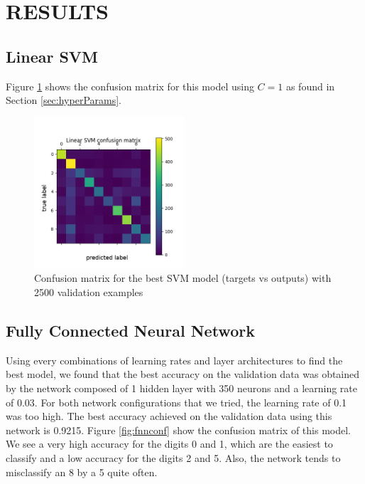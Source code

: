 \documentclass[letterpaper, 10 pt, conference]{ieeeconf}  %
\begin{document}
\section{RESULTS}

\subsection{Linear SVM}
Figure \ref{fig:svmconf} shows the confusion matrix for this model using $C=1$ as found in Section \ref{sec:hyperParams}.


\begin{figure}[h]
	\begin{center}
			\includegraphics[width=0.5\textwidth]{figures/svm_conf.png}  %
		\caption{Confusion matrix for the best SVM model (targets vs outputs) with 2500 validation examples}
		\label{fig:svmconf}
	\end{center}
\end{figure}


\subsection{Fully Connected Neural Network}
Using every combinations of learning rates and layer architectures to find the best model, we found that the best accuracy on the validation data was obtained by the network composed of 1 hidden layer with 350 neurons and a learning rate of 0.03. For both network configurations that we tried, the learning rate of 0.1 was too high. The best accuracy achieved on the validation data using this network is 0.9215. Figure \ref{fig:fnnconf} show the confusion matrix of this model. We see a very high accuracy for the digits 0 and 1, which are the easiest to classify and a low accuracy for the digits 2 and 5. Also, the network tends to misclassify an 8 by a 5 quite often.
\end{document}
